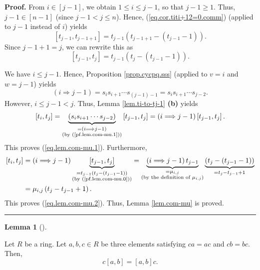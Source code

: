 \documentclass[numbers=enddot,12pt,final,onecolumn,notitlepage]{scrartcl}%
\theoremstyle{definition}
\newtheorem{lem}[theo]{Lemma}
\newenvironment{lemma}[1][]
{\begin{lem}[#1]\begin{leftbar}}
{\end{leftbar}\end{lem}}
\newenvironment{proof}[1][Proof]{\noindent\textbf{#1.} }{\ \rule{0.5em}{0.5em}}
\begin{document}
\begin{proof}
From $i\in\left[  j-1\right]  $, we obtain $1\leq i\leq j-1$, so that
$j-1\geq1$. Thus, $j-1\in\left[  n-1\right]  $ (since $j-1<j\leq n$). Hence,
(\ref{eq.cor.titi+12=0.comm}) (applied to $j-1$ instead of $i$) yields
\[
\left[  t_{j-1},t_{j-1+1}\right]  =t_{j-1}\left(  t_{j-1+1}-\left(
t_{j-1}-1\right)  \right)  .
\]
Since $j-1+1=j$, we can rewrite this as%
\begin{equation}
\left[  t_{j-1},t_{j}\right]  =t_{j-1}\left(  t_{j}-\left(  t_{j-1}-1\right)
\right)  . \label{pf.lem.com-mu.0}%
\end{equation}


We have $i\leq j-1$. Hence, Proposition \ref{prop.cycpq.sss} (applied to $v=i$
and $w=j-1$) yields%
\begin{equation}
\left(  i\Longrightarrow j-1\right)  =s_{i}s_{i+1}\cdots s_{\left(
j-1\right)  -1}=s_{i}s_{i+1}\cdots s_{j-2}. \label{pf.lem.com-mu.1}%
\end{equation}
However, $i\leq j-1<j$. Thus, Lemma \ref{lem.ti-to-tj-1} \textbf{(b)} yields%
\[
\left[  t_{i},t_{j}\right]  =\underbrace{\left(  s_{i}s_{i+1}\cdots
s_{j-2}\right)  }_{\substack{=\left(  i\Longrightarrow j-1\right)  \\\text{(by
(\ref{pf.lem.com-mu.1}))}}}\left[  t_{j-1},t_{j}\right]  =\left(
i\Longrightarrow j-1\right)  \left[  t_{j-1},t_{j}\right]  .
\]
This proves (\ref{eq.lem.com-mu.1}). Furthermore,%
\begin{align*}
\left[  t_{i},t_{j}\right]   &  =\left(  i\Longrightarrow j-1\right)
\underbrace{\left[  t_{j-1},t_{j}\right]  }_{\substack{=t_{j-1}\left(
t_{j}-\left(  t_{j-1}-1\right)  \right)  \\\text{(by (\ref{pf.lem.com-mu.0}%
))}}}=\underbrace{\left(  i\Longrightarrow j-1\right)  t_{j-1}}%
_{\substack{=\mu_{i,j}\\\text{(by the definition of }\mu_{i,j}\text{)}%
}}\underbrace{\left(  t_{j}-\left(  t_{j-1}-1\right)  \right)  }%
_{=t_{j}-t_{j-1}+1}\\
&  =\mu_{i,j}\left(  t_{j}-t_{j-1}+1\right)  .
\end{align*}
This proves (\ref{eq.lem.com-mu.2}). Thus, Lemma \ref{lem.com-mu} is proved.
\end{proof}

\begin{lemma}
\label{lem.abc=cab}Let $R$ be a ring. Let $a,b,c\in R$ be three elements
satisfying $ca=ac$ and $cb=bc$. Then,%
\[
c\left[  a,b\right]  =\left[  a,b\right]  c.
\]

\end{lemma}
\end{document}
